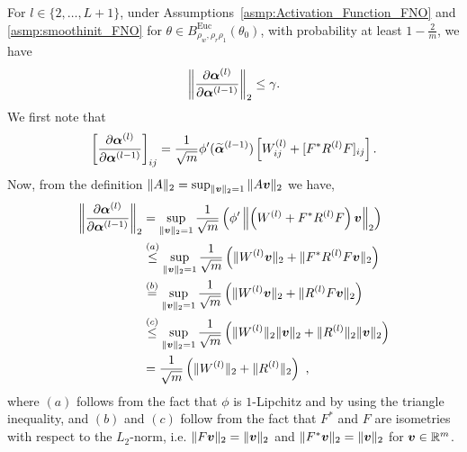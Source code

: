 \begin{lemm}
    \label{lemm:firstDerivativeBoundFNO}
    For $l\in \{2,\dots,L+1\}$, under Assumptions~\ref{asmp:Activation_Function_FNO} and \ref{asmp:smoothinit_FNO} for $\theta\in B^{\mathrm{Euc}}_{\rho_w,\rho_r\rho_1}(\theta_0)$, with probability at least $1 - \frac{2}{m}$, we have
    \begin{equation}
        \left\|\frac{\partial \boldsymbol{\alpha}^{(l)}}{\partial \boldsymbol{\alpha}^{(l-1)}}\right\|_2 \leq
        \gamma.
    \end{equation}
    \proof
    We first note that 
    \begin{align*}
        \left[
            {\frac{\partial \boldsymbol{\alpha}^{(l)}}{\partial \boldsymbol{\alpha}^{(l-1)}}}
        \right]_{ij} = 
        \frac{1}{\sqrt{m}} \phi'(\widetilde{\boldsymbol{\alpha}}^{(l-1)}) \left[ 
            W^{(l)}_{ij} + [F^*R^{(l)}F]_{ij}
        \right].
    \end{align*}
    Now, from the definition $\|A\|_2 = \sup_{\| {\bm{v}}\|_2 = 1} \| A{\bm{v}}\|_2$ we have,
    \begin{align}
        \begin{aligned}
            \left\|\frac{\partial \boldsymbol{\alpha}^{(l)}}{\partial \boldsymbol{\alpha}^{(l-1)}}\right\|_2 
            &= 
            \sup_{\|{\bm{v}}\|_2 = 1} \frac{1}{\sqrt{m}}
            \left(
                {\phi'} \left\|\left( W^{(l)} + F^*R^{(l)}F \right){\bm{v}}\right\|_2
            \right)\\
            &\overset{(a)}{\leq} \sup_{\|{\bm{v}}\|_2 = 1} \frac{1}{\sqrt{m}}
            \left(
                \|W^{(l)}{\bm{v}}\|_2 +  \|F^*R^{(l)}F{\bm{v}}\|_2
            \right)
            \\
            &\overset{(b)}{=} \sup_{\|{\bm{v}}\|_2 = 1} \frac{1}{\sqrt{m}}
            \left(
                \|W^{(l)}{\bm{v}}\|_2 +  \|R^{(l)}F{\bm{v}}\|_2
            \right)\\
            &\overset{(c)}{\leq}\sup_{\|{\bm{v}}\|_2 = 1} \frac{1}{\sqrt{m}}
            \left(
                \|W^{(l)}\|_2\lVert{\bm{v}}\rVert_2 +  \lVert R^{(l)}\rVert_2\lVert{\bm{v}}\rVert_2
            \right)\\
            &=\frac{1}{\sqrt{m}}
            \left(
                \|W^{(l)}\|_2 +  \lVert R^{(l)}\rVert_2
            \right)~,            
        \end{aligned}
    \end{align}
    where $(a)$ follows from the fact that $\phi$ is $1$-Lipchitz and by using the triangle inequality, and $(b)$ and $(c)$ follow from the fact that $F^*$ and $F$ are isometries with respect to the $L_2$-norm, i.e. $\|F {\bm{v}}\|_2=\|{\bm{v}}\|_2$ and $\|F^* {\bm{v}}\|_2=\|{\bm{v}}\|_2$ for ${\bm{v}}\in{\mathbb{R}}^{m}$.

\end{lemm}
